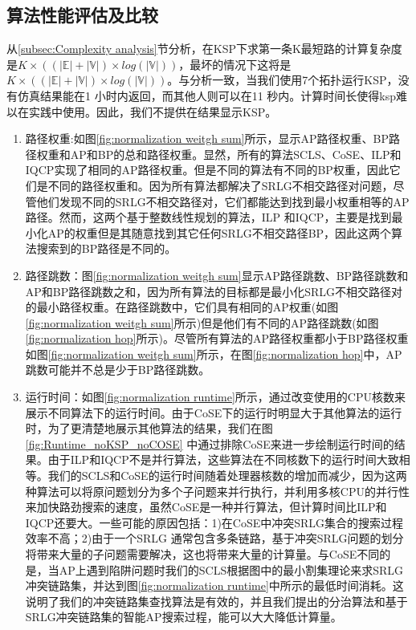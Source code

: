 \subsection{算法性能评估及比较}
从\ref{subsec:Complexity analysis}节分析，在KSP下求第一条K最短路的计算复杂度是$K\times ((|\mathbb{E}|+|\mathbb{V}|)\times log(|\mathbb{V}|))$，最坏的情况下这将是$K\times ((|\mathbb{E}|+|\mathbb{V}|)\times log(|\mathbb{V}|))$。与分析一致，当我们使用7个拓扑运行KSP，没有仿真结果能在1 小时内返回，而其他人则可以在11 秒内。计算时间长使得ksp难以在实践中使用。因此，我们不提供在结果显示KSP。
\begin{enumerate}
  \item 路径权重:如图\ref{fig:normalization weitgh sum}所示，显示AP路径权重、BP路径权重和AP和BP的总和路径权重。显然，所有的算法SCLS、CoSE、ILP和IQCP实现了相同的AP路径权重。但是不同的算法有不同的BP权重，因此它们是不同的路径权重和。因为所有算法都解决了SRLG不相交路径对问题，尽管他们发现不同的SRLG不相交路径对，它们都能达到找到最小权重相等的AP路径。然而，这两个基于整数线性规划的算法，ILP 和IQCP，主要是找到最小化AP的权重但是其随意找到其它任何SRLG不相交路径BP，因此这两个算法搜索到的BP路径是不同的。
  \item 路径跳数：图\ref{fig:normalization weitgh sum}显示AP路径跳数、BP路径跳数和AP和BP路径跳数之和，因为所有算法的目标都是最小化SRLG不相交路径对的最小路径权重。在路径跳数中，它们具有相同的AP权重(如图\ref{fig:normalization weitgh sum}所示)但是他们有不同的AP路径跳数(如图\ref{fig:normalization hop}所示)。尽管所有算法的AP路径权重都小于BP路径权重如图\ref{fig:normalization weitgh sum}所示，在图\ref{fig:normalization hop}中，AP跳数可能并不总是少于BP路径跳数。
  \item 运行时间：如图\ref{fig:normalization runtime}所示，通过改变使用的CPU核数来展示不同算法下的运行时间。由于CoSE下的运行时明显大于其他算法的运行时，为了更清楚地展示其他算法的结果，我们在图\ref{fig:Runtime_noKSP_noCOSE} 中通过排除CoSE来进一步绘制运行时间的结果。由于ILP和IQCP不是并行算法，这些算法在不同核数下的运行时间大致相等。我们的SCLS和CoSE的运行时间随着处理器核数的增加而减少，因为这两种算法可以将原问题划分为多个子问题来并行执行，并利用多核CPU的并行性来加快路劲搜索的速度，虽然CoSE是一种并行算法，但计算时间比ILP和IQCP还要大。一些可能的原因包括：1)在CoSE中冲突SRLG集合的搜索过程效率不高；2)由于一个SRLG 通常包含多条链路，基于冲突SRLG问题的划分将带来大量的子问题需要解决，这也将带来大量的计算量。与CoSE不同的是，当AP上遇到陷阱问题时我们的SCLS根据图中的最小割集理论来求SRLG冲突链路集，并达到图\ref{fig:normalization runtime}中所示的最低时间消耗。这说明了我们的冲突链路集查找算法是有效的，并且我们提出的分治算法和基于SRLG冲突链路集的智能AP搜索过程，能可以大大降低计算量。

\end{enumerate}
